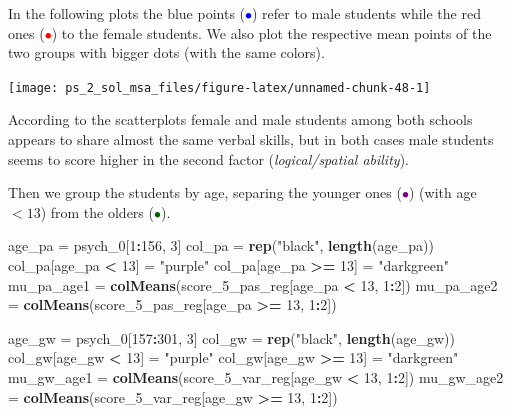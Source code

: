 \documentclass[
]{article}
\newenvironment{Shaded}{\begin{snugshade}}{\end{snugshade}}
\newcommand{\DecValTok}[1]{\textcolor[rgb]{0.00,0.00,0.81}{#1}}
\newcommand{\FunctionTok}[1]{\textcolor[rgb]{0.13,0.29,0.53}{\textbf{#1}}}
\newcommand{\NormalTok}[1]{#1}
\newcommand{\OtherTok}[1]{\textcolor[rgb]{0.56,0.35,0.01}{#1}}
\newcommand{\SpecialCharTok}[1]{\textcolor[rgb]{0.81,0.36,0.00}{\textbf{#1}}}
\newcommand{\StringTok}[1]{\textcolor[rgb]{0.31,0.60,0.02}{#1}}
\theoremstyle{plain}
\begin{document}
In the following plots the blue points (\textcolor{blue}{$\bullet$})
refer to male students while the red ones (\textcolor{red}{$\bullet$})
to the female students. We also plot the respective mean points of the
two groups with bigger dots (with the same colors).

\begin{center}\texttt{[image: ps\_2\_sol\_msa\_files/figure-latex/unnamed-chunk-48-1]} \end{center}

According to the scatterplots female and male students among both
schools appears to share almost the same verbal skills, but in both
cases male students seems to score higher in the second factor
(\textit{logical/spatial ability}).

Then we group the students by age, separing the younger ones
(\textcolor{purple}{$\bullet$}) (with age \(< 13\)) from the olders
(\textcolor{darkgreen}{$\bullet$}).

\smallskip

\begin{Shaded}
\begin{Highlighting}[]
\NormalTok{age\_pa }\OtherTok{=}\NormalTok{ psych\_0[}\DecValTok{1}\SpecialCharTok{:}\DecValTok{156}\NormalTok{, }\DecValTok{3}\NormalTok{]}
\NormalTok{col\_pa }\OtherTok{=} \FunctionTok{rep}\NormalTok{(}\StringTok{"black"}\NormalTok{, }\FunctionTok{length}\NormalTok{(age\_pa))}
\NormalTok{col\_pa[age\_pa }\SpecialCharTok{\textless{}} \DecValTok{13}\NormalTok{] }\OtherTok{=} \StringTok{"purple"}
\NormalTok{col\_pa[age\_pa }\SpecialCharTok{\textgreater{}=} \DecValTok{13}\NormalTok{] }\OtherTok{=} \StringTok{"darkgreen"}
\NormalTok{mu\_pa\_age1 }\OtherTok{=} \FunctionTok{colMeans}\NormalTok{(score\_5\_pas\_reg[age\_pa }\SpecialCharTok{\textless{}} \DecValTok{13}\NormalTok{, }\DecValTok{1}\SpecialCharTok{:}\DecValTok{2}\NormalTok{])}
\NormalTok{mu\_pa\_age2 }\OtherTok{=} \FunctionTok{colMeans}\NormalTok{(score\_5\_pas\_reg[age\_pa }\SpecialCharTok{\textgreater{}=} \DecValTok{13}\NormalTok{, }\DecValTok{1}\SpecialCharTok{:}\DecValTok{2}\NormalTok{])}

\NormalTok{age\_gw }\OtherTok{=}\NormalTok{ psych\_0[}\DecValTok{157}\SpecialCharTok{:}\DecValTok{301}\NormalTok{, }\DecValTok{3}\NormalTok{]}
\NormalTok{col\_gw }\OtherTok{=} \FunctionTok{rep}\NormalTok{(}\StringTok{"black"}\NormalTok{, }\FunctionTok{length}\NormalTok{(age\_gw))}
\NormalTok{col\_gw[age\_gw }\SpecialCharTok{\textless{}} \DecValTok{13}\NormalTok{] }\OtherTok{=} \StringTok{"purple"}
\NormalTok{col\_gw[age\_gw }\SpecialCharTok{\textgreater{}=} \DecValTok{13}\NormalTok{] }\OtherTok{=} \StringTok{"darkgreen"}
\NormalTok{mu\_gw\_age1 }\OtherTok{=} \FunctionTok{colMeans}\NormalTok{(score\_5\_var\_reg[age\_gw }\SpecialCharTok{\textless{}} \DecValTok{13}\NormalTok{, }\DecValTok{1}\SpecialCharTok{:}\DecValTok{2}\NormalTok{])}
\NormalTok{mu\_gw\_age2 }\OtherTok{=} \FunctionTok{colMeans}\NormalTok{(score\_5\_var\_reg[age\_gw }\SpecialCharTok{\textgreater{}=} \DecValTok{13}\NormalTok{, }\DecValTok{1}\SpecialCharTok{:}\DecValTok{2}\NormalTok{])}
\end{Highlighting}
\end{Shaded}
\end{document}
